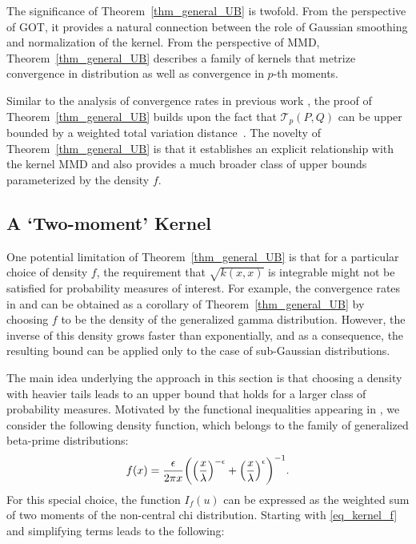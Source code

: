 \documentclass{article}
\theoremstyle{definition}
\newcommand{\cT}{\mathcal{T}}
\newcommand{\eps}{\epsilon}
\let\originalleft\left
\let\originalright\right
\renewcommand{\left}{\mathopen{}\mathclose\bgroup\originalleft}
\renewcommand{\right}{\aftergroup\egroup\originalright}
\begin{document}
The significance of Theorem~\ref{thm_general_UB} is twofold. From the perspective of GOT, it provides a natural connection between the role of Gaussian smoothing and normalization of the kernel. From the perspective of MMD, Theorem~\ref{thm_general_UB} describes a family of kernels that metrize convergence in distribution as well as convergence in $p$-th moments.

Similar to the analysis of convergence rates in previous work \cite{goldfeld:2020,  goldfeld:2020b},  the proof of Theorem~\ref{thm_general_UB} builds upon  the fact that $\cT_p(P,Q)$ can be upper bounded by a weighted total variation distance~\cite[Theorem~6.13]{villani2008optimal}. The novelty of Theorem~\ref{thm_general_UB} is that it establishes an explicit relationship with the kernel MMD and also provides a much broader class of upper bounds parameterized by the density $f$.  
 
 

\subsection{A `Two-moment' Kernel}

One potential limitation of Theorem~\ref{thm_general_UB} is that for a particular choice of density $f$, the requirement that $\sqrt{k(x,x)}$ is integrable might not be satisfied for probability measures of interest. For example, the convergence rates in  \cite{goldfeld:2020} and \cite{goldfeld:2020b} can be obtained as a corollary of  Theorem~\ref{thm_general_UB} by choosing $f$ to be the density of the generalized gamma distribution.
However, the inverse of this density grows faster than exponentially, and as a consequence, the resulting bound can be applied only to the case of sub-Gaussian distributions. 

The main idea underlying the approach in this section is that choosing a density with heavier tails leads to an upper bound that holds for a larger class of probability measures. Motivated by the functional inequalities appearing in \cite{reeves:2020d}, we consider the following density function, which belongs to the family of generalized beta-prime distributions:
\begin{align*}
f(x)= \frac{\eps}{2\pi x} \left( \left(\frac{x}{\lambda}\right)^{-\eps} + \left(\frac{x}{\lambda}\right)^{\eps}  \right)^{-1}. %
\end{align*}
For this special choice, the function $I_f(u)$ can be expressed as the weighted sum of two moments of the non-central chi distribution. Starting with  \eqref{eq_kernel_f} and simplifying terms leads to the following: 
\end{document}
